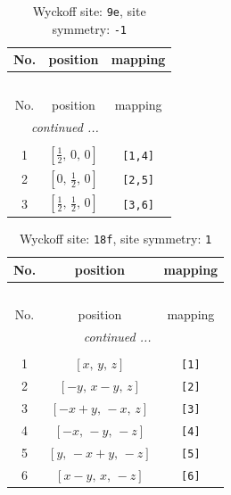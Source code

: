 \documentclass[fleqn,8pt]{jsarticle}
\begin{document}
\begin{longtable}{ccc}
\caption{Wyckoff site: {\tt 9e}, site symmetry: {\tt -1}}
 \\
 \hline \hline
No. & position & mapping \\ \hline \endfirsthead

\multicolumn{2}{l}{\tablename\ \thetable{}} \\
 \hline \hline
No. & position & mapping \\ \hline \endhead

 \hline \hline
\multicolumn{2}{r}{\footnotesize\it continued ...} \\ \endfoot

 \hline \hline
\multicolumn{2}{r}{} \\ \endlastfoot

1 & $\left[ \frac{1}{2},\, 0,\, 0 \right]$ & {\tt [1,4]} \\ \hline
2 & $\left[ 0,\, \frac{1}{2},\, 0 \right]$ & {\tt [2,5]} \\ \hline
3 & $\left[ \frac{1}{2},\, \frac{1}{2},\, 0 \right]$ & {\tt [3,6]} \\
\end{longtable}
\renewcommand{\arraystretch}{1.2}
\begin{longtable}{ccc}
\caption{Wyckoff site: {\tt 18f}, site symmetry: {\tt 1}}
 \\
 \hline \hline
No. & position & mapping \\ \hline \endfirsthead

\multicolumn{2}{l}{\tablename\ \thetable{}} \\
 \hline \hline
No. & position & mapping \\ \hline \endhead

 \hline \hline
\multicolumn{2}{r}{\footnotesize\it continued ...} \\ \endfoot

 \hline \hline
\multicolumn{2}{r}{} \\ \endlastfoot

1 & $\left[ x,\, y,\, z \right]$ & {\tt [1]} \\ \hline
2 & $\left[ - y,\, x - y,\, z \right]$ & {\tt [2]} \\ \hline
3 & $\left[ - x + y,\, - x,\, z \right]$ & {\tt [3]} \\ \hline
4 & $\left[ - x,\, - y,\, - z \right]$ & {\tt [4]} \\ \hline
5 & $\left[ y,\, - x + y,\, - z \right]$ & {\tt [5]} \\ \hline
6 & $\left[ x - y,\, x,\, - z \right]$ & {\tt [6]} \\
\end{longtable}
\end{document}
